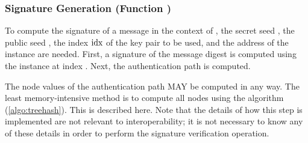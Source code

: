 
\subsubsection{\xmss Signature Generation (Function \xmsssign)}\label{sec:xmss:sign}

   To compute the \xmss signature of a message \msg in the context of \spx, 
   the secret seed \sseed, the public seed \pseed, the index $\textrm{idx}$ of the 
   \wotsp key 
   pair to be used, and the address \adrs of the \xmss instance are needed.
   First, a \wotsp signature of the message digest is computed using the 
   \wotsp instance at index \idx.  Next, the authentication path is computed.
   
   The node values of the authentication path MAY be computed in any
   way. The least memory-intensive method is to compute all nodes using the 
   \treehash algorithm (\autoref{algo:treehash}). This is described here. 
   Note that the details of how this step is implemented are not relevant to 
   interoperability; it is not necessary to know any of these details in order 
   to perform the signature verification operation.
% 
% 


